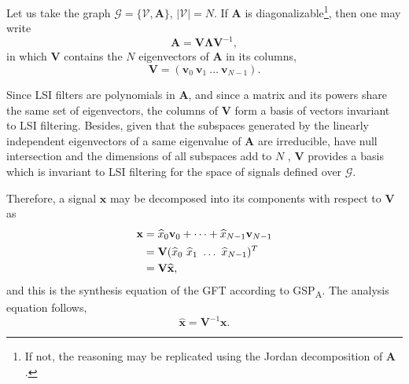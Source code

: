 Let us take the graph $ \mathcal{G} = \{\mathcal{V}, \mathbf{A}\} $, $ |\mathcal{V}| =N $. If $ \mathbf{A} $ is diagonalizable\footnote{If not, the reasoning may be replicated using the Jordan decomposition of $ \mathbf{A} $.}, then one may write
\begin{equation}\label{eq:gft_01}
\mathbf{A} = \mathbf{V} \mathbf{\Lambda} \mathbf{V}^{-1},
\end{equation}
in which $ \mathbf{V} $ contains the $ N $ eigenvectors of $ \mathbf{A} $ in its columns,
\begin{equation}\label{eq:gft_02}
\mathbf{V} = (\mathbf{v}_0 \ \mathbf{v}_1 \ \dots\ \mathbf{v}_{N-1}).
\end{equation}

Since LSI filters are polynomials in $ \mathbf{A} $, and since a matrix and its powers share the same set of eigenvectors, the columns of $ \mathbf{V} $ form a basis of vectors invariant to LSI filtering. Besides, given that the subspaces generated by the linearly independent eigenvectors of a same eigenvalue of $ \mathbf{A} $ are irreducible, have null intersection and the dimensions of all subspaces add to $ N $ \cite{sandryhaila2013gft}, $ \mathbf{V} $ provides a basis which is invariant to LSI filtering for the space of signals defined over $ \mathcal{G} $.

Therefore, a signal $ \mathbf{x} $ may be decomposed into its components with respect to $ \mathbf{V} $ as
\begin{align}\label{eq:GFT_inv}
\mathbf{x} &= \widehat{x}_0 \mathbf{v}_0 + \dots + \widehat{x}_{N-1} \mathbf{v}_{N-1} \notag \\
&= \mathbf{V} (\widehat{x}_0 \ \widehat{x}_1 \ \dots \ \widehat{x}_{N-1})^T \notag \\
&= \mathbf{V} \widehat{\mathbf{x}},
\end{align}
and this is the synthesis equation of the GFT according to GSP\textsubscript{A}. The analysis equation follows,
\begin{equation}\label{eq:GFT_fwd}
\widehat{\mathbf{x}} = \mathbf{V}^{-1} \mathbf{x}.
\end{equation}

